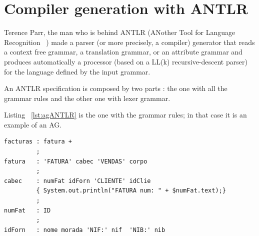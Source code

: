 \documentclass[
  oneside,
  11pt, a4paper,
  footinclude=true,
  headinclude=true,
  cleardoublepage=empty
]{scrbook}
\begin{document}
\section{Compiler generation with ANTLR}

Terence Parr, the man who is behind ANTLR (ANother Tool for Language Recognition ~\citep{parr2007,Par05}) made a parser (or more precisely, a compiler) generator that reads a context free grammar, a translation grammar, or an attribute grammar and produces automatically a processor (based on a LL(k) recursive-descent parser) for the language defined by the input grammar.

An ANTLR specification is composed by two parts : the one with all the grammar rules and the other one with lexer grammar.

Listing ~\ref{lst:agANTLR} is the one with the grammar rules; in that case it is an  example of an AG.

\begin{lstlisting}[caption={AG representation on ANTLR},label={lst:agANTLR}]
facturas : fatura +
         ;
fatura   : 'FATURA' cabec 'VENDAS' corpo
         ;
cabec    : numFat idForn 'CLIENTE' idClie
         { System.out.println("FATURA num: " + $numFat.text);}
         ;
numFat   : ID
         ;
idForn   : nome morada 'NIF:' nif  'NIB:' nib
\end{lstlisting}
\end{document}
